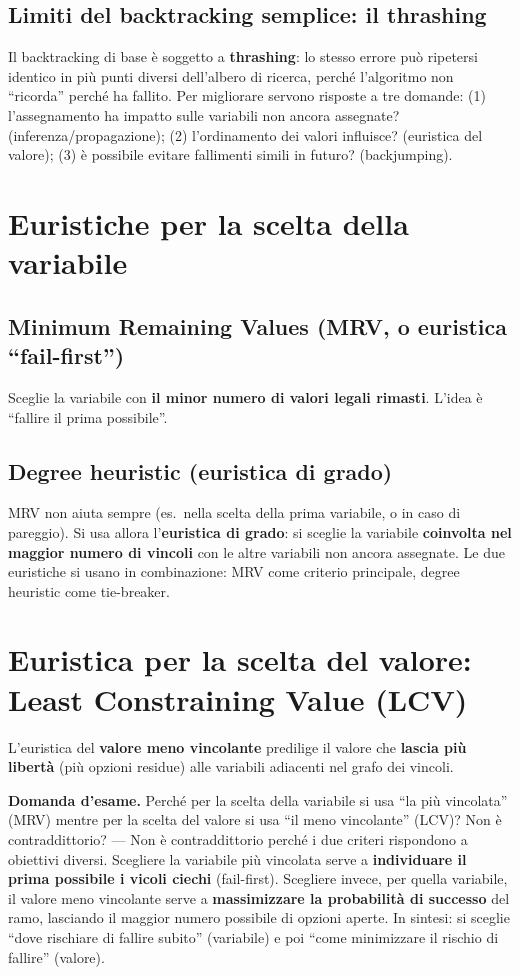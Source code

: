 \documentclass[11pt,a4paper]{report}
\newcommand{\domandaesame}[1]{\begin{esame}\textbf{Domanda d'esame.} #1\end{esame}}
\begin{document}
\subsection*{Limiti del backtracking semplice: il thrashing}

Il backtracking di base è soggetto a \textbf{thrashing}: lo stesso errore può ripetersi identico in più punti diversi dell'albero di ricerca, perché l'algoritmo non ``ricorda'' perché ha fallito. Per migliorare servono risposte a tre domande: (1) l'assegnamento ha impatto sulle variabili non ancora assegnate? (inferenza/propagazione); (2) l'ordinamento dei valori influisce? (euristica del valore); (3) è possibile evitare fallimenti simili in futuro? (backjumping).

\section{Euristiche per la scelta della variabile}

\subsection*{Minimum Remaining Values (MRV, o euristica ``fail-first'')}

Sceglie la variabile con \textbf{il minor numero di valori legali rimasti}. L'idea è ``fallire il prima possibile''.

\subsection*{Degree heuristic (euristica di grado)}

MRV non aiuta sempre (es.\ nella scelta della prima variabile, o in caso di pareggio). Si usa allora l'\textbf{euristica di grado}: si sceglie la variabile \textbf{coinvolta nel maggior numero di vincoli} con le altre variabili non ancora assegnate. Le due euristiche si usano in combinazione: MRV come criterio principale, degree heuristic come tie-breaker.

\section{Euristica per la scelta del valore: Least Constraining Value (LCV)}

L'euristica del \textbf{valore meno vincolante} predilige il valore che \textbf{lascia più libertà} (più opzioni residue) alle variabili adiacenti nel grafo dei vincoli.

\domandaesame{Perché per la scelta della variabile si usa ``la più vincolata'' (MRV) mentre per la scelta del valore si usa ``il meno vincolante'' (LCV)? Non è contraddittorio? --- Non è contraddittorio perché i due criteri rispondono a obiettivi diversi. Scegliere la variabile più vincolata serve a \textbf{individuare il prima possibile i vicoli ciechi} (fail-first). Scegliere invece, per quella variabile, il valore meno vincolante serve a \textbf{massimizzare la probabilità di successo} del ramo, lasciando il maggior numero possibile di opzioni aperte. In sintesi: si sceglie ``dove rischiare di fallire subito'' (variabile) e poi ``come minimizzare il rischio di fallire'' (valore).}
\end{document}
